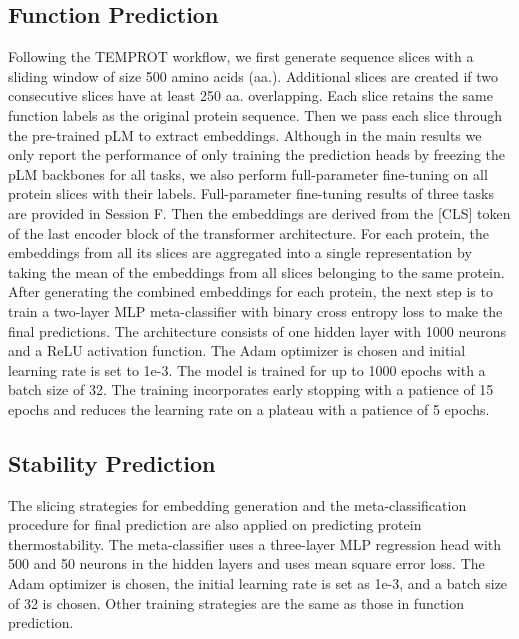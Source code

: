 \documentclass{article}
\begin{document}
\subsection*{Function Prediction}
Following the TEMPROT workflow, we first generate sequence slices with a sliding window of size 500 amino acids (aa.). Additional slices are created if two consecutive slices have at least 250 aa. overlapping. Each slice retains the same function labels as the original protein sequence. Then we pass each slice through the pre-trained pLM to extract embeddings. Although in the main results we only report the performance of only training the prediction heads by freezing the pLM backbones for all tasks, we also perform full-parameter fine-tuning on all protein slices with their labels. Full-parameter fine-tuning results of three tasks are provided in Session F. Then the embeddings are derived from the [CLS] token of the last encoder block of the transformer architecture. For each protein, the embeddings from all its slices are aggregated into a single representation by taking the mean of the embeddings from all slices belonging to the same protein. After generating the combined embeddings for each protein, the next step is to train a two-layer MLP meta-classifier with binary cross entropy loss to make the final predictions. The architecture consists of one hidden layer with 1000 neurons and a ReLU activation function. The Adam optimizer is chosen and initial learning rate is set to 1e-3. The model is trained for up to 1000 epochs with a batch size of 32. The training incorporates early stopping with a patience of 15 epochs and reduces the learning rate on a plateau with a patience of 5 epochs.

\subsection*{Stability Prediction}
The slicing strategies for embedding generation and the meta-classification procedure for final prediction are also applied on predicting protein thermostability. The meta-classifier uses a three-layer MLP regression head with 500 and 50 neurons in the hidden layers and uses mean square error loss. The Adam optimizer is chosen, the initial learning rate is set as 1e-3, and a batch size of 32 is chosen. Other training strategies are the same as those in function prediction.
\end{document}
